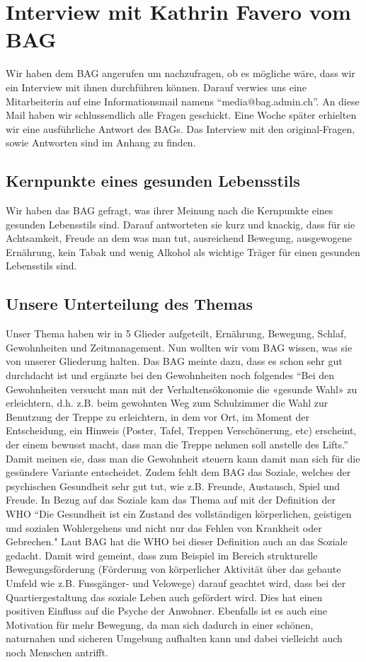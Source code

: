 \chapter{Interview mit Kathrin Favero vom BAG}
Wir haben dem BAG angerufen um nachzufragen, ob es mögliche wäre, dass wir ein Interview mit ihnen durchführen können. Darauf verwies uns eine Mitarbeiterin auf eine Informationsmail namens “media@bag.admin.ch”. An diese Mail haben wir schlussendlich alle Fragen geschickt. Eine Woche später erhielten wir eine ausführliche Antwort des BAGs.
\newline
Das Interview mit den original-Fragen, sowie Antworten sind im Anhang zu finden.
\section{Kernpunkte eines gesunden Lebensstils}
Wir haben das BAG gefragt, was ihrer Meinung nach die Kernpunkte eines gesunden Lebensstils sind. Darauf antworteten sie kurz und knackig, dass für sie Achtsamkeit, Freude an dem was man tut, ausreichend Bewegung, ausgewogene Ernährung, kein Tabak und wenig Alkohol als wichtige Träger für einen gesunden Lebensstils sind.
\section{Unsere Unterteilung des Themas}
Unser Thema haben wir in 5 Glieder aufgeteilt, Ernährung, Bewegung, Schlaf, Gewohnheiten und Zeitmanagement. Nun wollten wir vom BAG wissen, was sie von unserer Gliederung halten. Das BAG meinte dazu, dass es schon sehr gut durchdacht ist und ergänzte bei den Gewohnheiten noch folgendes “Bei den Gewohnheiten versucht man mit der Verhaltensökonomie die «gesunde Wahl» zu erleichtern, d.h. z.B. beim gewohnten Weg zum Schulzimmer die Wahl zur Benutzung der Treppe zu erleichtern, in dem vor Ort, im Moment der Entscheidung, ein Hinweis (Poster, Tafel, Treppen Verschönerung, etc) erscheint, der einem bewusst macht, dass man die Treppe nehmen soll anstelle des Lifts.” Damit meinen sie, dass man die Gewohnheit steuern kann damit man sich für die gesündere Variante entscheidet. Zudem fehlt dem BAG das Soziale, welches der psychischen Gesundheit sehr gut tut, wie z.B. Freunde, Austausch, Spiel und Freude.
\newline
In Bezug auf das Soziale kam das Thema auf mit der Definition der WHO “Die Gesundheit ist ein Zustand des vollständigen körperlichen, geistigen und sozialen Wohlergehens und nicht nur das Fehlen von Krankheit oder Gebrechen." \cite{gesundheit_definition}
\newline
Laut BAG hat die WHO bei dieser Definition auch an das Soziale gedacht. Damit wird gemeint, dass zum Beispiel im Bereich strukturelle Bewegungsförderung (Förderung von körperlicher Aktivität über das gebaute Umfeld wie z.B. Fussgänger- und Velowege) darauf geachtet wird, dass bei der Quartiergestaltung das soziale Leben auch gefördert wird. Dies hat einen positiven Einfluss auf die Psyche der Anwohner. Ebenfalls ist es auch eine Motivation für mehr Bewegung, da man sich dadurch in einer schönen, naturnahen und sicheren Umgebung aufhalten kann und dabei vielleicht auch noch Menschen antrifft.

